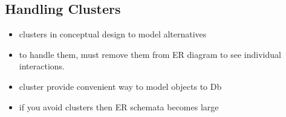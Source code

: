 \documentclass{article}
\begin{document}
	\subsection{Handling Clusters}
		\begin{itemize}
			\item clusters in conceptual design to model alternatives
			\item to handle them, must remove them from ER diagram to see individual interactions.
			\item cluster provide convenient way to model objects to Db
			\item if you avoid clusters then ER schemata becomes large
		\end{itemize}
\end{document}
